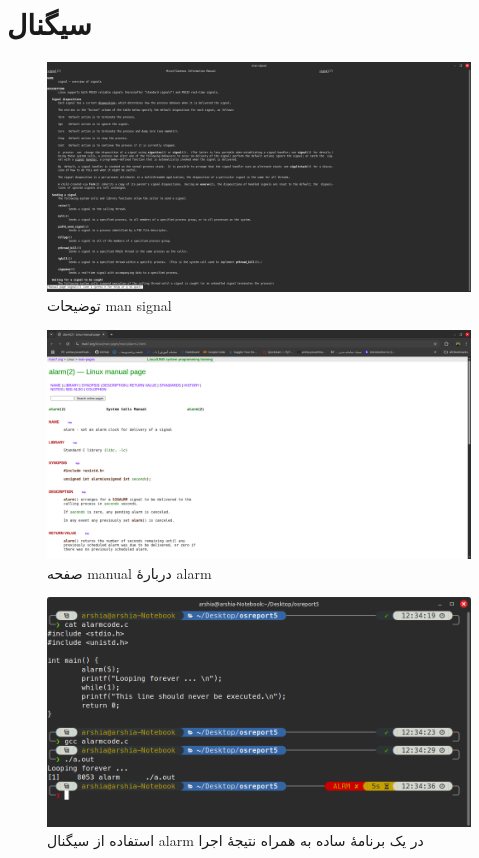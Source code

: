 \documentclass[12pt]{article}
\begin{document}
	\newpage
	\section{سیگنال}
	\begin{figure}[H]
		\centering
		\includegraphics[width=\textwidth]{report5-resources/8.png}
		\caption{توضیحات \textenglish{man signal}}
		\label{img:8}
	\end{figure}
	\begin{figure}[H]
		\centering
		\includegraphics[width=\textwidth]{report5-resources/9.png}
		\caption{صفحه \textenglish{manual} دربارهٔ \textenglish{alarm}}
		\label{img:9}
	\end{figure}
	\begin{figure}[H]
		\centering
		\includegraphics[width=\textwidth]{report5-resources/10.png}
		\caption{استفاده از سیگنال \textenglish{alarm} در یک برنامهٔ ساده به همراه نتیجهٔ اجرا}
		\label{img:10}
	\end{figure}
\end{document}
